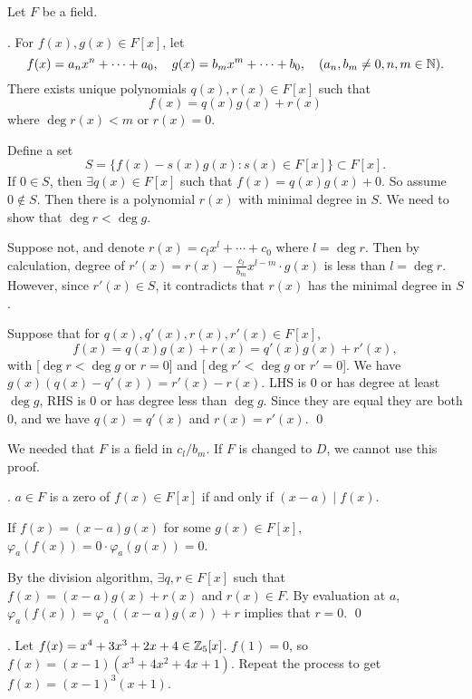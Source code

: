 
Let \(F\) be a field.

\thm.  For \(f(x), g(x) \in F[x]\), let
\[
    f(x) = a_nx^n + \cdots + a_0, \quad g(x) = b_mx^m + \cdots + b_0, \quad (a_n, b_m \neq 0, n, m \in \mathbb{N}).
\]
There exists unique polynomials \(q(x), r(x) \in F[x]\) such that
\[
    f(x) = q(x)g(x) + r(x)
\]
where \(\deg r(x) < m\) or \(r(x) = 0\).

\pf {} Define a set
\[
    S = \{f(x) - s(x)g(x) : s(x) \in F[x]\} \subset F[x].
\]
If \(0 \in S\), then \(\exists q(x) \in F[x]\) such that \(f(x) = q(x)g(x) + 0\). So assume \(0 \notin S\). Then there is a polynomial \(r(x)\) with minimal degree in \(S\). We need to show that \(\deg r < \deg g\).

Suppose not, and denote \(r(x) = c_lx^l + \cdots + c_0\) where \(l = \deg r\). Then by calculation, degree of \(r'(x) = r(x) - \frac{c_l}{b_m} x^{l-m} \cdot g(x)\) is less than \(l = \deg r\). However, since \(r'(x) \in S\), it contradicts that \(r(x)\) has the minimal degree in \(S\).

 Suppose that for \(q(x), q'(x), r(x), r'(x) \in F[x]\),
\[
    f(x) = q(x)g(x) + r(x) = q'(x)g(x) + r'(x),
\]
with [\(\deg r < \deg g\) or \(r = 0\)] and [\(\deg r' < \deg g\) or \(r' = 0\)]. We have \(g(x) (q(x) - q'(x)) = r'(x) - r(x)\). LHS is 0 or has degree at least \(\deg g\), RHS is 0 or has degree less than \(\deg g\). Since they are equal they are both 0, and we have \(q(x) = q'(x)\) and \(r(x) = r'(x)\). \qed

\rmk We needed that \(F\) is a field in \(c_l/b_m\). If \(F\) is changed to \(D\), we cannot use this proof.

\cor.  \(a \in F\) is a zero of \(f(x) \in F[x]\) if and only if \((x-a) \mid f(x)\).

\pf \note{\mimpd} If \(f(x) = (x-a)g(x)\) for some \(g(x) \in F[x]\), \(\varphi_a(f(x)) = 0 \cdot \varphi_a(g(x)) = 0\).

\note{\mimp} By the division algorithm, \(\exists q, r \in F[x]\) such that \(f(x) = (x-a)g(x) + r(x)\) and \(r(x) \in F\). By evaluation at \(a\), \(\varphi_a(f(x)) = \varphi_a((x-a)g(x)) + r\) implies that \(r = 0\). \qed

\ex. Let \(f(x) = x^4 + 3x^3 + 2x + 4 \in \mathbb{Z}_5[x]\). \(f(1) = 0\), so \(f(x) = (x-1)(x^3 + 4x^2 + 4x + 1)\). Repeat the process to get \(f(x) = (x-1)^3(x+1)\).

